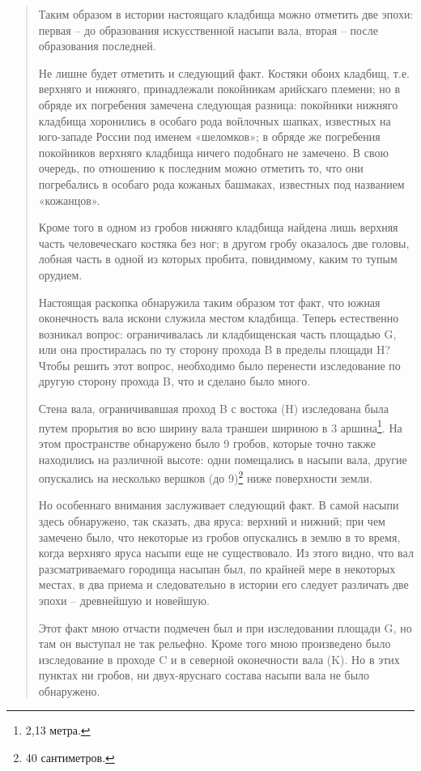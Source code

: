 \begin{quotation}
Таким образом в истории настоящаго кладбища можно отметить две эпохи: первая – до образования искусственной насыпи вала, вторая – после образования последней.

Не лишне будет отметить и следующий факт. Костяки обоих кладбищ, т.е. верхняго и нижняго, принадлежали покойникам арийскаго племени; но в обряде их погребения замечена следующая разница: покойники нижняго кладбища хоронились в особаго рода войлочных шапках, известных на юго-западе России под именем «шеломков»; в обряде же погребения покойников верхняго кладбища ничего подобнаго не замечено. В свою очередь, по отношению к последним можно отметить то, что они погребались в особаго рода кожаных башмаках, известных под названием «кожанцов».

Кроме того в одном из гробов нижняго кладбища найдена лишь верхняя часть человеческаго костяка без ног; в другом гробу оказалось две головы, лобная часть в одной из которых пробита, повидимому, каким то тупым орудием.

Настоящая раскопка обнаружила таким образом тот факт, что южная оконечность вала искони служила местом кладбища. Теперь естественно возникал вопрос: ограничивалась ли кладбищенская часть площадью G, или она простиралась по ту сторону прохода B в пределы площади H? Чтобы решить этот вопрос, необходимо было перенести изследование по другую сторону прохода B, что и сделано было много. 

Стена вала, ограничивавшая проход B с востока (H) изследована была путем прорытия во всю ширину вала траншеи шириною в 3 аршина\footnote{2,13 метра.}. На этом пространстве обнаружено было 9 гробов, которые точно также находились на различной высоте: одни помещались в насыпи вала, другие опускались на несколько вершков (до 9)\footnote{40 сантиметров.} ниже поверхности земли. 

Но особеннаго внимания заслуживает следующий факт. В самой насыпи здесь обнаружено, так сказать, два яруса: верхний и нижний; при чем замечено было, что некоторые из гробов опускались в землю в то время, когда верхняго яруса насыпи еще не существовало. Из этого видно, что вал разсматриваемаго городища насыпан был, по крайней мере в некоторых местах, в два приема и следовательно в истории его следует различать две эпохи – древнейшую и новейшую. 

Этот факт мною отчасти подмечен был и при изследовании площади G, но там он выступал не так рельефно. Кроме того мною произведено было изследование в проходе C и в северной оконечности вала (K). Но в этих пунктах ни гробов, ни двух-яруснаго состава насыпи вала не было обнаружено.


\end{quotation}
